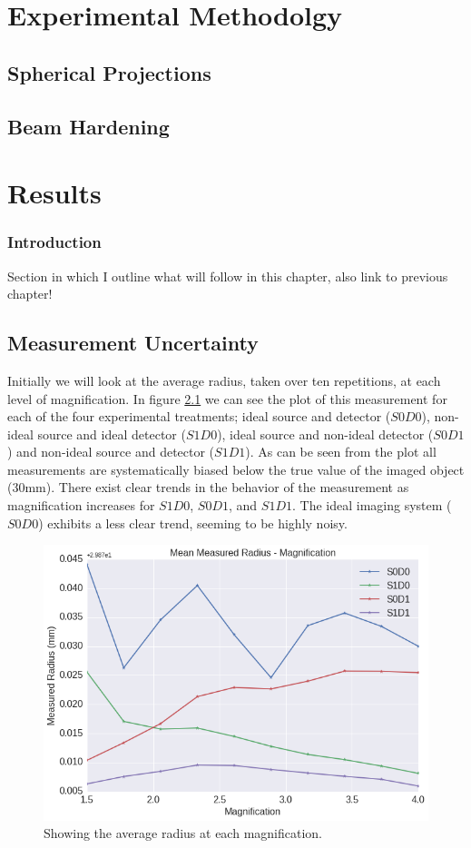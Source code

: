 \documentclass[
  twoside,
  11pt, a4paper,
  footinclude=true,
  headinclude=true,
  cleardoublepage=empty
]{scrbook}
\begin{document}
\chapter{Experimental Methodolgy}
\section{Spherical Projections}
\section{Beam Hardening}
\chapter{Results}

\subsection{Introduction}

Section in which I outline what will follow in this chapter, also link to previous chapter!

\section{Measurement Uncertainty}

Initially we will look at the average radius, taken over ten repetitions, at each level of magnification. In figure \ref{avgmeasuredradius} we can see the plot of this measurement for each of the four experimental treatments; ideal source and detector ($S0D0$), non-ideal source and ideal detector ($S1D0$), ideal source and non-ideal detector ($S0D1$) and non-ideal source and detector ($S1D1$). As can be seen from the plot all measurements are systematically biased below the true value of the imaged object (30mm). There exist clear trends in the behavior of the measurement as magnification increases for $S1D0$, $S0D1$, and $S1D1$. The ideal imaging system ($S0D0$) exhibits a less clear trend, seeming to be highly noisy.

\begin{figure}[h!]
  \centering
    \includegraphics[width=\textwidth]{figures/output_10_0.png}
    \caption{Showing the average radius at each magnification.}
    \label{avgmeasuredradius}
\end{figure}
\end{document}
